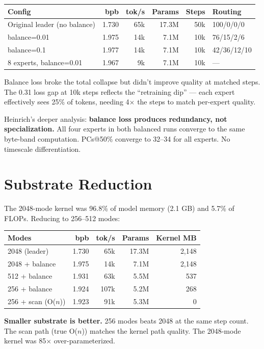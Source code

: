 \documentclass[11pt,a4paper]{report}
\begin{document}
\begin{center}
\begin{tabular}{lrrrrl}
\toprule
Config & bpb & tok/s & Params & Steps & Routing \\
\midrule
Original leader (no balance) & 1.730 & 65k & 17.3M & 50k & 100/0/0/0 \\
balance=0.01 & 1.975 & 14k & 7.1M & 10k & 76/15/2/6 \\
balance=0.1 & 1.977 & 14k & 7.1M & 10k & 42/36/12/10 \\
8 experts, balance=0.01 & 1.967 & 9k & 7.1M & 10k & --- \\
\bottomrule
\end{tabular}
\end{center}

Balance loss broke the total collapse but didn't improve quality at matched steps. The 0.31 loss gap at 10k steps reflects the ``retraining dip'' --- each expert effectively sees 25\% of tokens, needing 4$\times$ the steps to match per-expert quality.

Heinrich's deeper analysis: \textbf{balance loss produces redundancy, not specialization.} All four experts in both balanced runs converge to the same byte-band computation. PCs@50\% converge to 32--34 for all experts. No timescale differentiation.

\section{Substrate Reduction}

The 2048-mode kernel was 96.8\% of model memory (2.1 GB) and 5.7\% of FLOPs. Reducing to 256--512 modes:

\begin{center}
\begin{tabular}{lrrrr}
\toprule
Modes & bpb & tok/s & Params & Kernel MB \\
\midrule
2048 (leader) & 1.730 & 65k & 17.3M & 2,148 \\
2048 + balance & 1.975 & 14k & 7.1M & 2,148 \\
512 + balance & 1.931 & 63k & 5.5M & 537 \\
256 + balance & 1.924 & 107k & 5.2M & 268 \\
256 + scan (O($n$)) & 1.923 & 91k & 5.3M & 0 \\
\bottomrule
\end{tabular}
\end{center}

\textbf{Smaller substrate is better.} 256 modes beats 2048 at the same step count. The scan path (true O($n$)) matches the kernel path quality. The 2048-mode kernel was 85$\times$ over-parameterized.
\end{document}
